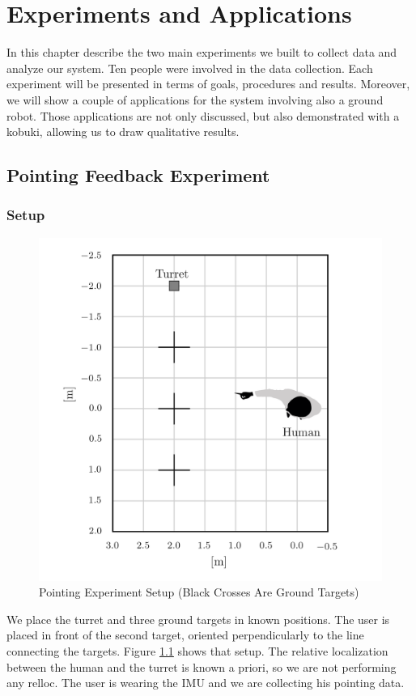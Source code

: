 \chapter{Experiments and Applications}\label{chap:4}
In this chapter describe the two main experiments we built to collect data and analyze our system. Ten people were involved in the data collection. Each experiment will be presented in terms of goals, procedures and results. Moreover, we will show a couple of applications for the system involving also a ground robot. Those applications are not only discussed, but also demonstrated with a kobuki, allowing us to draw qualitative results.
\section{Pointing Feedback Experiment}
\subsection{Setup}
\begin{figure}
	\centering
	\includegraphics[width=\textwidth]{img/pointingExpSetup.png}%
	\caption{Pointing Experiment Setup (Black Crosses Are Ground Targets)}
	\label{fig:pointingExpSetup}
\end{figure}
We place the turret and three ground targets in known positions. The user is placed in front of the second target, oriented perpendicularly to the line connecting the targets. Figure \ref{fig:pointingExpSetup} shows that setup. The relative localization between the human and the turret is known a priori, so we are not performing any \ac{relloc}. The user is wearing the \ac{IMU} and we are collecting his pointing data.\\
